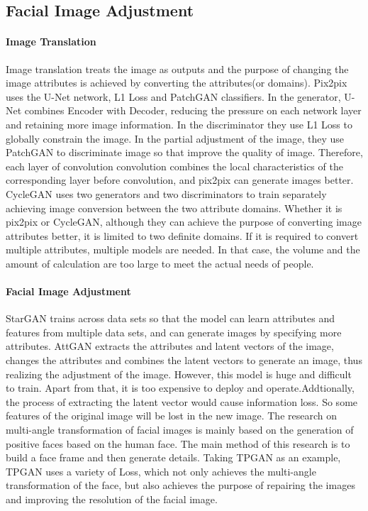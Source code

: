 \subsection{Facial Image Adjustment}

\paragraph{Image Translation}

Image translation treats the image as outputs and the purpose of changing the image attributes is achieved by converting the attributes(or domains).
Pix2pix uses the U-Net network, L1 Loss and PatchGAN classifiers.
In the generator, U-Net combines Encoder with Decoder,
    reducing the pressure on each network layer and retaining more image information.
In the discriminator they use L1 Loss to globally constrain the image.
In the partial adjustment of the image,
    they use PatchGAN to discriminate image so that improve the quality of image.
Therefore, each layer of convolution convolution combines the local characteristics of the corresponding layer before convolution,
    and pix2pix can generate images better.
CycleGAN uses two generators and two discriminators to train separately achieving image conversion between the two attribute domains.
Whether it is pix2pix or CycleGAN,
    although they can achieve the purpose of converting image attributes better,
    it is limited to two definite domains.
If it is required to convert multiple attributes, multiple models are needed.
In that case, the volume and the amount of calculation are too large to meet the actual needs of people.

\paragraph{Facial Image Adjustment}
StarGAN trains across data sets so that the model can learn attributes and features from multiple data sets,
    and can generate images by specifying more attributes.
AttGAN extracts the attributes and latent vectors of the image,
    changes the attributes and combines the latent vectors to generate an image,
    thus realizing the adjustment of the image. However,
    this model is huge and difficult to train.
Apart from that, it is too expensive to deploy and operate.Addtionally,
    the process of extracting the latent vector would cause information loss.
So some features of the original image will be lost in the new image.
The research on multi-angle transformation of facial images is mainly based on the generation of positive faces based on the human face. 
The main method of this research is to build a face frame and then generate details.
Taking TPGAN as an example, TPGAN uses a variety of Loss,
    which not only achieves the multi-angle transformation of the face,
    but also achieves the purpose of repairing the images and improving the resolution of the facial image.

